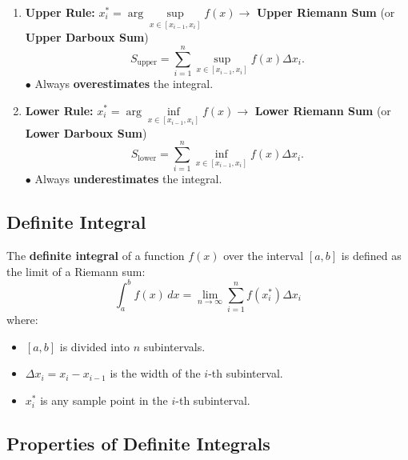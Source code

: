 \documentclass[a4paper,11pt]{article}
\theoremstyle{definition}
\theoremstyle{plain}
\theoremstyle{remark}
\begin{document}
\begin{tcolorbox}[breakable]
\begin{enumerate}
        \item \textbf{Upper Rule:} $x_i^* = \arg\sup\limits_{x \in [x_{i-1}, x_i]} f(x) \rightarrow$ \textbf{Upper Riemann Sum} (or \textbf{Upper Darboux Sum})
        \[
        S_{\text{upper}} = \sum_{i=1}^n \sup\limits_{x \in [x_{i-1}, x_i]} f(x) \Delta x_i.
        \]
        $\bullet$ Always \textbf{overestimates} the integral.

        \pagebreak
        
        \item \textbf{Lower Rule:} $x_i^* = \arg\inf\limits_{x \in [x_{i-1}, x_i]} f(x) \rightarrow$ \textbf{Lower Riemann Sum} (or \textbf{Lower Darboux Sum})
        \[
        S_{\text{lower}} = \sum_{i=1}^n \inf\limits_{x \in [x_{i-1}, x_i]} f(x) \Delta x_i.
        \]
        $\bullet$ Always \textbf{underestimates} the integral.
    \end{enumerate}
\end{tcolorbox}




\subsection{Definite Integral}

\begin{tcolorbox}
    The \textbf{definite integral} of a function $f(x)$ over the interval $[a,b]$ is defined as the limit of a Riemann sum:
    \[
    \int_{a}^{b} f(x) \, dx = \lim_{n \to \infty} \sum_{i=1}^n f(x_i^*) \Delta x_i
    \]
    where:
    \begin{itemize}
        \item $[a,b]$ is divided into $n$ subintervals.
        \item $\Delta x_i = x_i - x_{i-1}$ is the width of the $i$-th subinterval.
        \item $x_i^*$ is any sample point in the $i$-th subinterval.
    \end{itemize}
\end{tcolorbox}
\pagebreak




\subsection{Properties of Definite Integrals}
\end{document}
